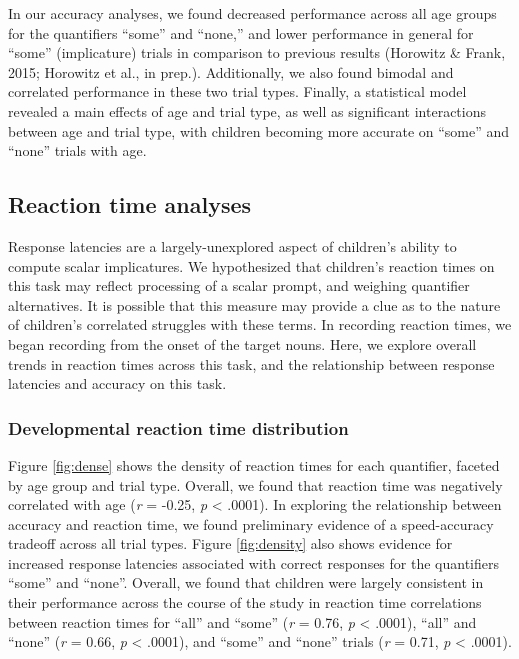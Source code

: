 \documentclass[10pt, letterpaper]{article}
\begin{document}
In our accuracy analyses, we found decreased performance across all age
groups for the quantifiers ``some'' and ``none,'' and lower performance
in general for ``some'' (implicature) trials in comparison to previous
results (Horowitz \& Frank, 2015; Horowitz et al., in prep.).
Additionally, we also found bimodal and correlated performance in these
two trial types. Finally, a statistical model revealed a main effects of
age and trial type, as well as significant interactions between age and
trial type, with children becoming more accurate on ``some'' and
``none'' trials with age.

\subsection{Reaction time analyses}\label{reaction-time-analyses}

Response latencies are a largely-unexplored aspect of children's ability
to compute scalar implicatures. We hypothesized that children's reaction
times on this task may reflect processing of a scalar prompt, and
weighing quantifier alternatives. It is possible that this measure may
provide a clue as to the nature of children's correlated struggles with
these terms. In recording reaction times, we began recording from the
onset of the target nouns. Here, we explore overall trends in reaction
times across this task, and the relationship between response latencies
and accuracy on this task.

\subsubsection{Developmental reaction time
distribution}\label{developmental-reaction-time-distribution}

Figure \ref{fig:dense} shows the density of reaction times for each
quantifier, faceted by age group and trial type. Overall, we found that
reaction time was negatively correlated with age (\emph{r} = -0.25,
\emph{p} \textless{} .0001). In exploring the relationship between
accuracy and reaction time, we found preliminary evidence of a
speed-accuracy tradeoff across all trial types. Figure \ref{fig:density}
also shows evidence for increased response latencies associated with
correct responses for the quantifiers ``some'' and ``none''. Overall, we
found that children were largely consistent in their performance across
the course of the study in reaction time correlations between reaction
times for ``all'' and ``some'' (\emph{r} = 0.76, \emph{p} \textless{}
.0001), ``all'' and ``none'' (\emph{r} = 0.66, \emph{p} \textless{}
.0001), and ``some'' and ``none'' trials (\emph{r} = 0.71, \emph{p}
\textless{} .0001).
\end{document}
